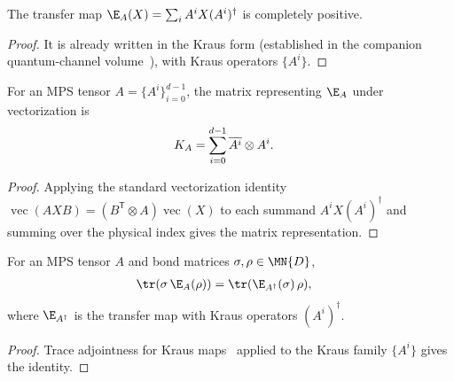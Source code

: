 \begin{lemma}\label{thm:transfer_cp}
    \leanok
    The transfer map $\E_A(X)=\sum_i A^iX(A^i)^\dagger$
    is completely positive.
\end{lemma}

\begin{proof}\leanok
    It is already written in the Kraus form
    (established in the companion quantum-channel volume~\cite[``Completely positive map'']{QICLean2026Blueprint}), with Kraus operators
    $\{A^i\}$.
\end{proof}

\begin{lemma}
    \label{thm:mps_transfer_matrix_kraus_sum}
    \leanok
    For an MPS tensor $A=\{A^i\}_{i=0}^{d-1}$, the matrix representing
    $\E_A$ under vectorization is
    \begin{align}
        K_A & =\sum_{i=0}^{d-1}\overline{A^i}\otimes A^i.
        \notag
    \end{align}
\end{lemma}

\begin{proof}\leanok
    Applying the standard vectorization identity
    $\operatorname{vec}(AXB)=(B^{\mathsf T}\otimes A)\operatorname{vec}(X)$
    to each summand $A^iX(A^i)^\dagger$ and summing over the physical index
    gives the matrix representation.
\end{proof}

\begin{lemma}
    \label{lem:trace_mul_transfer_map_adjoint}
    \leanok
    For an MPS tensor $A$ and bond matrices $\sigma, \rho\in\MN{D}$,
    \begin{align}
        \tr(\sigma\,\E_A(\rho)) & = \tr(\E_{A^\dagger}(\sigma)\,\rho),
        \notag
    \end{align}
    where $\E_{A^\dagger}$ is the transfer map with Kraus operators $(A^i)^\dagger$.
\end{lemma}

\begin{proof}\leanok
    Trace adjointness for Kraus maps~\cite[``Trace adjointness of a Kraus map'']{QICLean2026Blueprint}
    applied to the Kraus family $\{A^i\}$ gives the identity.
\end{proof}

